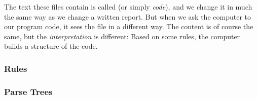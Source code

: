 The text these files contain is called \textsl{} (or simply \textsl{code}), and we change it in much the same way as we change a written report. But when we ask the computer to  our program code, it sees the file in a different way. The content is of course the same, but the \textsl{interpretation} is different: Based on some rules, the computer builds a  structure of the code.


\subsubsection{Rules}


\subsubsection{Parse Trees}

